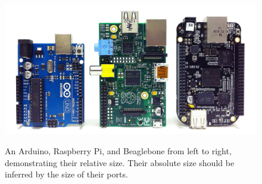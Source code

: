 \begin{figure}
	\centering
	\caption{An Arduino, Raspberry Pi, and Beaglebone from left to right, demonstrating their relative size.  Their absolute size should be inferred by the size of their ports.}
	\includegraphics[width=.9\textwidth]{gfx/pi-arduino-beaglebone.jpg}
	\label{fig:pi-arduino-beaglebone}
\end{figure}
